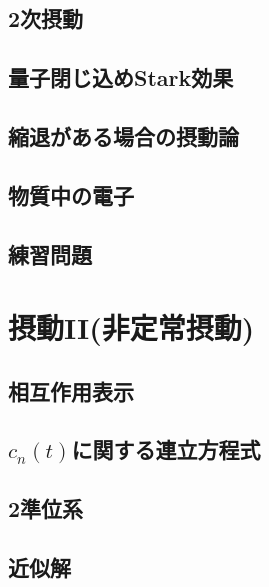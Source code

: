 \documentclass{report}
\begin{document}
      \subsection{2次摂動}
        
      \subsection{量子閉じ込めStark効果}
        
      \subsection{縮退がある場合の摂動論}
        
      \subsection{物質中の電子}
        
      \subsection{練習問題}
        
    \section{摂動II(非定常摂動)}
      
      \subsection{相互作用表示}
        
      \subsection{$c_n(t)$に関する連立方程式}
        
      \subsection{2準位系}
        
      \subsection{近似解}
        
\end{document}
